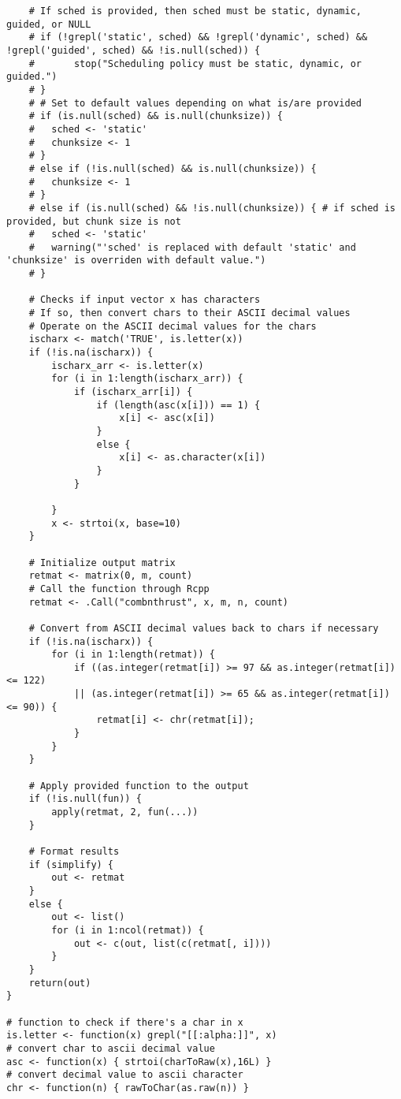 {\begin{lstlisting}
	# If sched is provided, then sched must be static, dynamic, guided, or NULL
	# if (!grepl('static', sched) && !grepl('dynamic', sched) && !grepl('guided', sched) && !is.null(sched)) {
	# 		stop("Scheduling policy must be static, dynamic, or guided.")
	# }
	# # Set to default values depending on what is/are provided
	# if (is.null(sched) && is.null(chunksize)) {
	# 	sched <- 'static'
	# 	chunksize <- 1
	# }
	# else if (!is.null(sched) && is.null(chunksize)) {
	# 	chunksize <- 1
	# }
	# else if (is.null(sched) && !is.null(chunksize)) { # if sched is provided, but chunk size is not
	# 	sched <- 'static'
	# 	warning("'sched' is replaced with default 'static' and 'chunksize' is overriden with default value.")
	# }

	# Checks if input vector x has characters
	# If so, then convert chars to their ASCII decimal values
	# Operate on the ASCII decimal values for the chars
	ischarx <- match('TRUE', is.letter(x))
	if (!is.na(ischarx)) {
		ischarx_arr <- is.letter(x)
		for (i in 1:length(ischarx_arr)) {
			if (ischarx_arr[i]) {
				if (length(asc(x[i])) == 1) {
					x[i] <- asc(x[i])
				}
				else {
					x[i] <- as.character(x[i])
				}
			}
			
		}
		x <- strtoi(x, base=10)
	}
	
	# Initialize output matrix
	retmat <- matrix(0, m, count)
	# Call the function through Rcpp
	retmat <- .Call("combnthrust", x, m, n, count)

	# Convert from ASCII decimal values back to chars if necessary
	if (!is.na(ischarx)) {
		for (i in 1:length(retmat)) {
			if ((as.integer(retmat[i]) >= 97 && as.integer(retmat[i]) <= 122)
			|| (as.integer(retmat[i]) >= 65 && as.integer(retmat[i]) <= 90)) {
				retmat[i] <- chr(retmat[i]);
			}
		}
	}

	# Apply provided function to the output
	if (!is.null(fun)) {
		apply(retmat, 2, fun(...))
	}

	# Format results
	if (simplify) {
		out <- retmat
	}
	else {
		out <- list()
		for (i in 1:ncol(retmat)) {
			out <- c(out, list(c(retmat[, i])))
		}
	}
	return(out)
}

# function to check if there's a char in x
is.letter <- function(x) grepl("[[:alpha:]]", x)
# convert char to ascii decimal value
asc <- function(x) { strtoi(charToRaw(x),16L) }
# convert decimal value to ascii character
chr <- function(n) { rawToChar(as.raw(n)) }


\end{lstlisting}}
